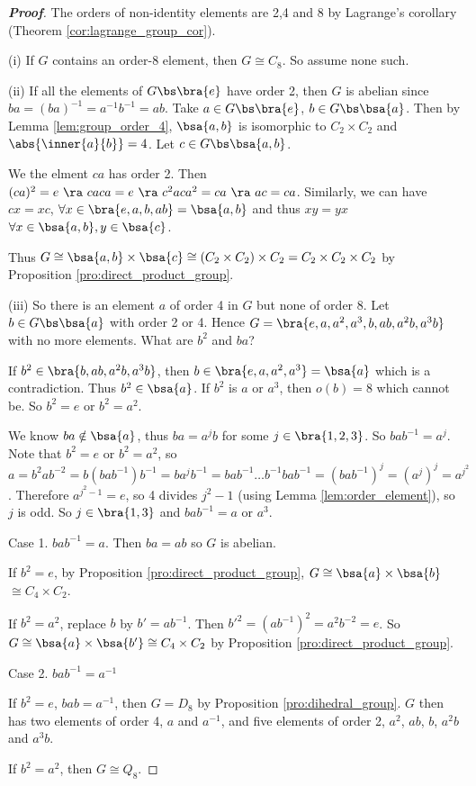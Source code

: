 \begin{proof}[\bf Proof]
The orders of non-identity elements are 2,4 and 8 by Lagrange's corollary (Theorem \ref{cor:lagrange_group_cor}).
\ben
\item [(i)] If $G$ contains an order-8 element, then $G\cong C_8$. So assume none such.
\item [(ii)] If all the elements of $G\bs\bra{e}$ have order 2, then $G$ is abelian since $ba = (ba)^{-1} = a^{-1}b^{-1} = ab$. Take $a\in G\bs\bra{e}$, $b\in G\bs\bsa{a}$. Then by Lemma \ref{lem:group_order_4}, $\bsa{a,b}$ is isomorphic to $C_2\times C_2$ and $\abs{\inner{a}{b}} = 4$. Let $c \in G\bs \bsa{a,b}$.

We the elment $ca$ has order 2. Then $(ca)^2 = e \ \ra \ caca = e \ \ra \ c^2aca^2 = ca \ \ra \ ac = ca$. Similarly, we can have $cx = xc$, $\forall x \in \bra{e,a,b,ab} = \bsa{a,b}$ and thus $xy = yx$ $\forall x\in \bsa{a,b},y\in \bsa{c}$.

Thus $G\cong \bsa{a,b}\times \bsa{c} \cong (C_2 \times C_2) \times C_2 = C_2 \times C_2 \times C_2$ by Proposition \ref{pro:direct_product_group}.
\item [(iii)] So there is an element $a$ of order 4 in $G$ but none of order 8. Let $b\in G\bs\bsa{a}$ with order 2 or 4. Hence $G=\bra{e,a,a^2,a^3,b,ab,a^2b,a^3b}$ with no more elements. What are $b^2$ and $ba$?
\ben
\item If $b^2 \in \bra{b,ab,a^2b, a^3b}$, then $b\in \bra{e,a,a^2,a^3}= \bsa{a}$ which is a contradiction. Thus $b^2 \in \bsa{a}$. If $b^2$ is $a$ or $a^3$, then $o(b) = 8$ which cannot be. So $b^2 = e$ or $b^2 = a^2$.
\item We know $ba \notin \bsa{a}$, thus $ba = a^j b$ for some $j\in \bra{1,2,3}$. So $bab^{-1} = a^j$. Note that $b^2 = e$ or $b^2 = a^2$, so $a = b^2 ab^{-2} = b(bab^{-1})b^{-1} = ba^jb^{-1} = bab^{-1}\dots b^{-1}ba b^{-1} = (bab^{-1})^j = (a^j)^j = a^{j^2}$. Therefore $a^{j^2-1} = e$, so 4 divides $j^2 -1$ (using Lemma \ref{lem:order_element}), so $j$ is odd. So $j\in \bra{1,3}$ and $bab^{-1} = a$ or $a^3$.
\een
\item [] Case 1. $bab^{-1} =a$. Then $ba = ab$ so $G$ is abelian.
\ben
\item If $b^2 = e$, by Proposition \ref{pro:direct_product_group}, $G\cong \bsa{a}\times \bsa{b}$  $\cong C_4\times C_2$.
\item If $b^2 = a^2$, replace $b$ by $b' = ab^{-1}$. Then $b'^2 = (ab^{-1})^2 = a^2 b^{-2} = e$. So $G\cong \bsa{a}\times \bsa{b'} \cong C_4 \times C_2$ by Proposition \ref{pro:direct_product_group}.
\een
\item [] Case 2. $bab^{-1} = a^{-1}$
\ben
\item If $b^2 = e$, $bab = a^{-1}$, then $G = D_8$ by Proposition \ref{pro:dihedral_group}. $G$ then has two elements of order 4, $a$ and $a^{-1}$, and five elements of order 2, $a^2$, $ab$, $b$, $a^2b$ and $a^3b$.
\item If $b^2 = a^2$, then $G\cong Q_8$.
\een
\een
\end{proof}

